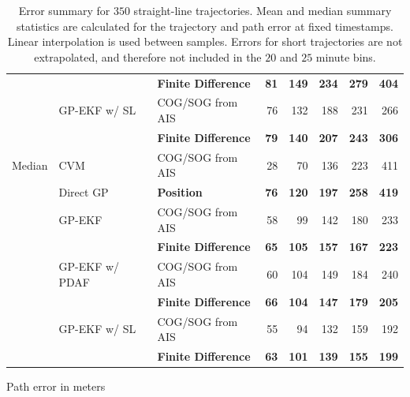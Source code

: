 \begin{table}[b]
\begin{subtable}{\textwidth}
{\begin{tabular}{lllrrrrr}
                        &                & \bf Finite Difference & \bf 81  & \bf 149 & \bf 234 & \bf 279 & \bf 404 \\
                        & GP-EKF w/ SL   & COG/SOG from AIS      & 76      & 132     & 188     & 231     & 266     \\
                        &                & \bf Finite Difference & \bf 79  & \bf 140 & \bf 207 & \bf 243 & \bf 306 \\
                \midrule
                Median  & CVM            & COG/SOG from AIS      & 28      & 70      & 136     & 223     & 411     \\
                        & Direct GP      & \bf Position          & \bf 76  & \bf 120 & \bf 197 & \bf 258 & \bf 419 \\
                        & GP-EKF         & COG/SOG from AIS      & 58      & 99      & 142     & 180     & 233     \\
                        &                & \bf Finite Difference & \bf 65  & \bf 105 & \bf 157 & \bf 167 & \bf 223 \\
                        & GP-EKF w/ PDAF & COG/SOG from AIS      & 60      & 104     & 149     & 184     & 240     \\
                        &                & \bf Finite Difference & \bf 66  & \bf 104 & \bf 147 & \bf 179 & \bf 205 \\
                        & GP-EKF w/ SL   & COG/SOG from AIS      & 55      & 94      & 132     & 159     & 192     \\
                        &                & \bf Finite Difference & \bf 63  & \bf 101 & \bf 139 & \bf 155 & \bf 199 \\
                \bottomrule
            \end{tabular}
        }
        \caption{Path error in meters}
        \label{table:stats_straight_path_err}
    \end{subtable}
    \caption{Error summary for $350$ straight-line trajectories. Mean and median summary statistics are calculated for the trajectory and path error at fixed timestamps. Linear interpolation is used between samples. Errors for short trajectories are not extrapolated, and therefore not included in the $20$ and $25$ minute bins.}
    \label{table:stats_straight_line_error}
\end{table}

